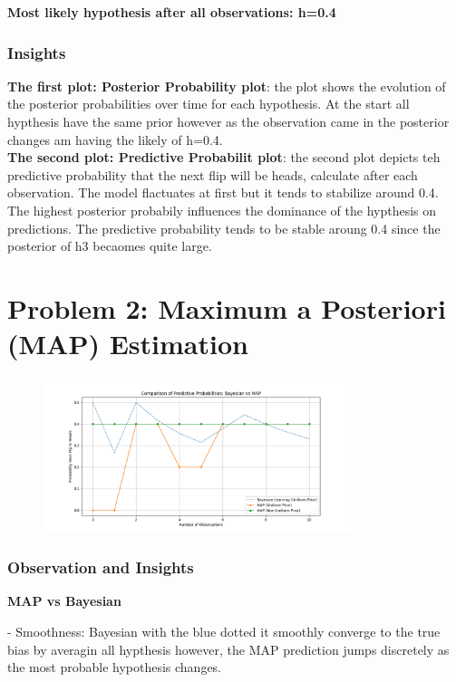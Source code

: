 \documentclass{article}
\begin{document}
\textbf{Most likely hypothesis after all observations: h=0.4}

\subsubsection*{Insights}

\textbf{The first plot: Posterior Probability plot}: the plot shows the evolution of the posterior probabilities over time for each hypothesis.
At the start all hypthesis have the same prior however as the observation came in the posterior changes am having the likely of h=0.4.\\
\textbf{The second plot: Predictive Probabilit plot}: the second plot depicts teh predictive probability that the next flip will be heads, calculate after each observation.
The model flactuates at first but it tends to stabilize around 0.4. The highest posterior probabily influences the dominance of the hypthesis on predictions. The predictive 
probability tends to be stable aroung 0.4 since the posterior of h3 becaomes quite large. 


\clearpage

\section*{Problem 2: Maximum a Posteriori (MAP) Estimation}
\begin{figure}[H]
    \centering
    \includegraphics[width=0.8\textwidth]{../Problem2/Figure_1.png}
    \label{fig:num_of_observation}
\end{figure}

\subsubsection*{Observation and Insights}
\textbf{MAP vs Bayesian}

- Smoothness: Bayesian with the blue dotted it smoothly converge  to the true bias by averagin all hypthesis however, the MAP prediction jumps discretely as the most probable hypothesis changes.
\end{document}
